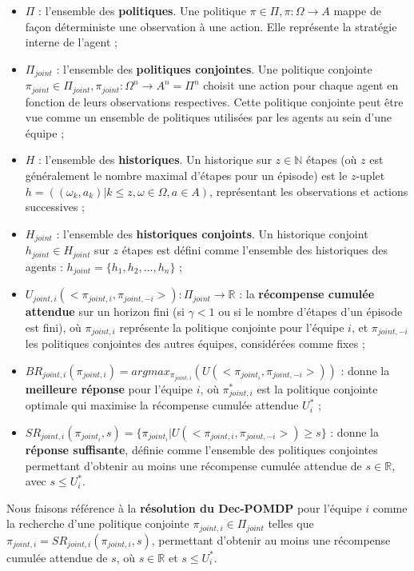 \documentclass[sigconf,anonymous]{aamas}
\begin{document}
\begin{itemize}
    \item $\Pi$ : l'ensemble des \textbf{politiques}. Une politique $\pi \in \Pi, \pi: \Omega \rightarrow A$ mappe de façon déterministe une observation à une action. Elle représente la stratégie interne de l'agent ;
    \item $\Pi_{joint}$ : l'ensemble des \textbf{politiques conjointes}. Une politique conjointe $\pi_{joint} \in \Pi_{joint}, \pi_{joint}: \Omega^n \rightarrow A^n = \Pi^n$ choisit une action pour chaque agent en fonction de leurs observations respectives. Cette politique conjointe peut être vue comme un ensemble de politiques utilisées par les agents au sein d'une équipe ;
    \item $H$ : l'ensemble des \textbf{historiques}. Un historique sur $z \in \mathbb{N}$ étapes (où $z$ est généralement le nombre maximal d'étapes pour un épisode) est le $z$-uplet $h = ((\omega_{k}, a_{k}) | k \leq z, \omega \in \Omega, a \in A)$, représentant les observations et actions successives ;
    \item $H_{joint}$ : l'ensemble des \textbf{historiques conjoints}. Un historique conjoint $h_{joint} \in H_{joint}$ sur $z$ étapes est défini comme l'ensemble des historiques des agents : $h_{joint} = \{h_1, h_2, ..., h_n\}$ ;
    \item $U_{joint,i}(<\pi_{joint,i}, \pi_{joint,-i}>): \Pi_{joint} \rightarrow \mathbb{R}$ : la \textbf{récompense cumulée attendue} sur un horizon fini (si $\gamma < 1$ ou si le nombre d'étapes d'un épisode est fini), où $\pi_{joint,i}$ représente la politique conjointe pour l'équipe $i$, et $\pi_{joint,-i}$ les politiques conjointes des autres équipes, considérées comme fixes ;
    \item $BR_{joint,i}(\pi_{joint,i}) = argmax_{\pi_{joint,i}}(U(<\pi_{joint_i}, \pi_{joint,-i}>))$ : donne la \textbf{meilleure réponse} pour l'équipe $i$, où $\pi_{joint,i}^*$ est la politique conjointe optimale qui maximise la récompense cumulée attendue $U_i^*$ ;
    \item $SR_{joint,i}(\pi_{joint_i}, s) = \{\pi_{joint_i} | U(<\pi_{joint,i}, \pi_{joint,-i}>) \geq s\}$ : donne la \textbf{réponse suffisante}, définie comme l'ensemble des politiques conjointes permettant d'obtenir au moins une récompense cumulée attendue de $s \in \mathbb{R}$, avec $s \leq U_i^*$.
\end{itemize}

Nous faisons référence à la \textbf{résolution du Dec-POMDP} pour l'équipe $i$ comme la recherche d'une politique conjointe $\pi_{joint,i} \in \Pi_{joint}$ telles que $\pi_{joint,i} = SR_{joint,i}(\pi_{joint,i}, s)$, permettant d'obtenir au moins une récompense cumulée attendue de $s$, où $s \in \mathbb{R}$ et $s \leq U_i^*$.
\end{document}
